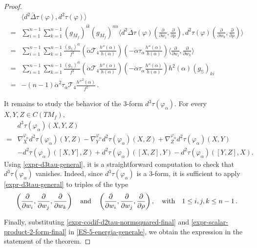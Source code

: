 \documentclass[11pt]{amsart}
\theoremstyle{plain}
\theoremstyle{definition}
\numberwithin{equation}{section}
\def \s{{\mathbb S}}
\numberwithin{equation}{section}
\begin{document}
\begin{proof}
{\small
\begin{align}\label{expr-scalar-product-2-form-final}
&\langle d^2\overline{\Delta}\tau(\varphi), d^2 \tau(\varphi) \rangle\nonumber\\
=& 
\sum_{i=1}^{n-1}\sum_{k=1}^{n-1} (g_{M_f})^{ik}(g_{M_f})^{nn}
\langle d^2\overline{\Delta}\tau(\varphi)\left(\frac{\partial}{\partial w_i},\frac{\partial}{\partial \rho}\right), d^2\tau(\varphi)\left(\frac{\partial}{\partial w_k},\frac{\partial}{\partial \rho}\right)\rangle\nonumber\\
=& 
\sum_{i=1}^{n-1}\sum_{k=1}^{n-1} \frac{(g_{\s})^{ik}}{f^2} \left(\dot{\alpha} \mathcal{T}_4 \frac{h''(\alpha)}{h(\alpha)}\right) \left(-\dot{\alpha} \tau_{\alpha} \frac{h''(\alpha)}{h(\alpha)}\right) \langle \frac{\partial}{\partial w_i}, \frac{\partial}{\partial w_k}\rangle\nonumber\\
=& 
\sum_{i=1}^{n-1}\sum_{k=1}^{n-1} \frac{(g_{\s})^{ik}}{f^2} \left(\dot{\alpha} \mathcal{T}_4 \frac{h''(\alpha)}{h(\alpha)}\right) \left(-\dot{\alpha} \tau_{\alpha} \frac{h''(\alpha)}{h(\alpha)}\right) h^2(\alpha) (g_{\s})_{ki}\nonumber\\
=&
-(n-1) \dot{\alpha}^2 \tau_{\alpha} \mathcal{T}_4 \frac{h''^2(\alpha)}{f^2}\,.
\end{align}
}

It remains to study the behavior of the $3$-form $d^3 \tau(\varphi_{\alpha})$. For every $X, Y, Z \in C(TM_f)$,
{\small 
\begin{align}\label{expr-d3tau-general}
&d^3 \tau(\varphi_{\alpha})(X, Y, Z) \nonumber\\
 =& \nabla^{\varphi_{\alpha}}_X d^2 \tau(\varphi_{\alpha})(Y, Z) - \nabla^{\varphi_{\alpha}}_Y d^2 \tau(\varphi_{\alpha})(X, Z) + \nabla^{\varphi_{\alpha}}_Z d^2 \tau(\varphi_{\alpha})(X, Y)\nonumber \\
& - d^2 \tau(\varphi_{\alpha})\left([X, Y], Z\right) + d^2 \tau(\varphi_{\alpha})\left([X, Z], Y\right) - d^2 \tau(\varphi_{\alpha})\left([Y, Z], X\right).
\end{align}
}
Using \eqref{expr-d3tau-general}, it is a straightforward computation to check that $d^3\tau(\varphi_{\alpha})$ vanishes. Indeed, since 
$d^3\tau(\varphi_{\alpha})$ is a $3$-form, it is sufficient to apply \eqref{expr-d3tau-general} to triples of the type  
\[
\left(\frac{\partial}{\partial w_i}, \frac{\partial}{\partial w_j}, \frac{\partial}{\partial w_k} \right)\quad{\rm and}\quad\left(\frac{\partial}{\partial w_i}, \frac{\partial}{\partial w_j}, \frac{\partial}{\partial \rho} \right),\quad {\rm with} \quad 1 \leq i, j, k \leq n-1\,.
\] 

Finally,  
substituting \eqref{expr-codif-d2tau-normsquared-final} and \eqref{expr-scalar-product-2-form-final} in \eqref{ES-5-energia-generale}, we obtain the expression in the statement of the theorem.
\end{proof}
\end{document}
